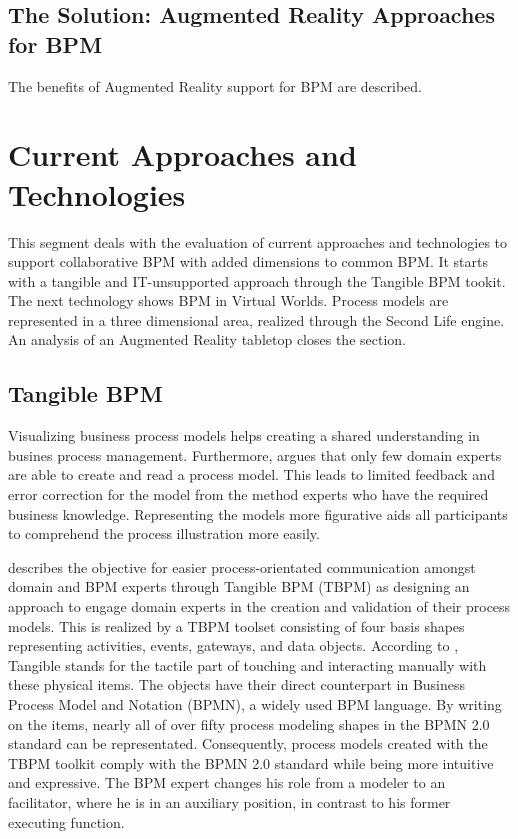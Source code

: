 	\subsection{The Solution: Augmented Reality Approaches for BPM}
	The benefits of Augmented Reality support for BPM are described.
	
\section{Current Approaches and Technologies}
This segment deals with the evaluation of current approaches and technologies to support collaborative BPM with added dimensions
to common BPM. It starts with a tangible and IT-unsupported approach through the Tangible BPM tookit. The next technology 
shows BPM in Virtual Worlds. Process models are represented in a three dimensional area, realized through the Second Life 
engine. An analysis of an Augmented Reality tabletop closes the section.

	\subsection{Tangible BPM}
	
	Visualizing business process models helps creating a shared understanding in busines 
	process management. Furthermore,  argues that only few domain experts
	are able to create and read a process model. This leads to limited feedback and error correction
	for the model from the method experts who have the required business knowledge. Representing the
	models more figurative aids all participants to comprehend the process illustration more easily.

	 describes the objective for easier process-orientated communication amongst
	domain and BPM experts through Tangible BPM (TBPM) as designing an approach to engage domain
	experts in the creation and validation of their process models. This is realized by a TBPM 
	toolset consisting of four basis shapes representing activities, events, gateways, and data
	objects. According to , Tangible stands for the tactile part of touching and 
	interacting manually with these	physical items. The objects have their direct counterpart in 
	Business Process Model and Notation (BPMN), a widely used BPM language. By writing on the items,
	nearly all of over fifty process modeling shapes in the BPMN 2.0 standard can be representated. 
	Consequently, process models created with the TBPM toolkit comply with the BPMN 2.0 standard 
	while being more intuitive and expressive. The BPM expert changes his role from a modeler to
	an facilitator, where he is in an auxiliary position, in contrast to his former executing
	function.

